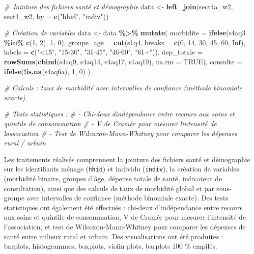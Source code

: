 \documentclass[
  11pt,
]{article}
\newenvironment{Shaded}{\begin{snugshade}}{\end{snugshade}}
\newcommand{\AttributeTok}[1]{\textcolor[rgb]{0.13,0.29,0.53}{#1}}
\newcommand{\CommentTok}[1]{\textcolor[rgb]{0.56,0.35,0.01}{\textit{#1}}}
\newcommand{\ConstantTok}[1]{\textcolor[rgb]{0.56,0.35,0.01}{#1}}
\newcommand{\DecValTok}[1]{\textcolor[rgb]{0.00,0.00,0.81}{#1}}
\newcommand{\FunctionTok}[1]{\textcolor[rgb]{0.13,0.29,0.53}{\textbf{#1}}}
\newcommand{\NormalTok}[1]{#1}
\newcommand{\OtherTok}[1]{\textcolor[rgb]{0.56,0.35,0.01}{#1}}
\newcommand{\SpecialCharTok}[1]{\textcolor[rgb]{0.81,0.36,0.00}{\textbf{#1}}}
\newcommand{\StringTok}[1]{\textcolor[rgb]{0.31,0.60,0.02}{#1}}
\begin{document}
\begin{Shaded}
\begin{Highlighting}[]
\CommentTok{\# Jointure des fichiers santé et démographie}
\NormalTok{data }\OtherTok{\textless{}{-}} \FunctionTok{left\_join}\NormalTok{(sect4a\_w2, sect1\_w2, }\AttributeTok{by =} \FunctionTok{c}\NormalTok{(}\StringTok{"hhid"}\NormalTok{, }\StringTok{"indiv"}\NormalTok{))}

\CommentTok{\# Création de variables}
\NormalTok{data }\OtherTok{\textless{}{-}}\NormalTok{ data }\SpecialCharTok{\%\textgreater{}\%}
  \FunctionTok{mutate}\NormalTok{(}
    \AttributeTok{morbidite  =} \FunctionTok{ifelse}\NormalTok{(s4aq3 }\SpecialCharTok{\%in\%} \FunctionTok{c}\NormalTok{(}\DecValTok{1}\NormalTok{, }\DecValTok{2}\NormalTok{), }\DecValTok{1}\NormalTok{, }\DecValTok{0}\NormalTok{),}
    \AttributeTok{groupe\_age =} \FunctionTok{cut}\NormalTok{(s1q4, }\AttributeTok{breaks =} \FunctionTok{c}\NormalTok{(}\DecValTok{0}\NormalTok{, }\DecValTok{14}\NormalTok{, }\DecValTok{30}\NormalTok{, }\DecValTok{45}\NormalTok{, }\DecValTok{60}\NormalTok{, }\ConstantTok{Inf}\NormalTok{),}
                     \AttributeTok{labels =} \FunctionTok{c}\NormalTok{(}\StringTok{"\textless{}15"}\NormalTok{, }\StringTok{"15{-}30"}\NormalTok{, }\StringTok{"31{-}45"}\NormalTok{, }\StringTok{"46{-}60"}\NormalTok{, }\StringTok{"61+"}\NormalTok{)),}
    \AttributeTok{dep\_totale =} \FunctionTok{rowSums}\NormalTok{(}\FunctionTok{cbind}\NormalTok{(s4aq9, s4aq14, s4aq17, s4aq19), }\AttributeTok{na.rm =} \ConstantTok{TRUE}\NormalTok{),}
    \AttributeTok{consulte   =} \FunctionTok{ifelse}\NormalTok{(}\SpecialCharTok{!}\FunctionTok{is.na}\NormalTok{(s4aq6a), }\DecValTok{1}\NormalTok{, }\DecValTok{0}\NormalTok{)}
\NormalTok{  )}

\CommentTok{\# Calculs : taux de morbidité avec intervalles de confiance (méthode binomiale exacte)}

\CommentTok{\# Tests statistiques :}
\CommentTok{\#   {-} Chi{-}deux d\textquotesingle{}indépendance entre recours aux soins et quintile de consommation}
\CommentTok{\#   {-} V de Cramér pour mesurer l\textquotesingle{}intensité de l\textquotesingle{}association}
\CommentTok{\#   {-} Test de Wilcoxon{-}Mann{-}Whitney pour comparer les dépenses rural / urbain}
\end{Highlighting}
\end{Shaded}

Les traitements réalisés comprennent la jointure des fichiers santé et
démographie sur les identifiants ménage (\texttt{hhid}) et individu
(\texttt{indiv}), la création de variables (morbidité binaire, groupes
d'âge, dépense totale de santé, indicateur de consultation), ainsi que
des calculs de taux de morbidité global et par sous-groupe avec
intervalles de confiance (méthode binomiale exacte). Des tests
statistiques ont également été effectués : chi-deux d'indépendance entre
recours aux soins et quintile de consommation, V de Cramér pour mesurer
l'intensité de l'association, et test de Wilcoxon-Mann-Whitney pour
comparer les dépenses de santé entre milieux rural et urbain. Des
visualisations ont été produites : barplots, histogrammes, boxplots,
violin plots, barplots 100 \% empilés.
\end{document}
